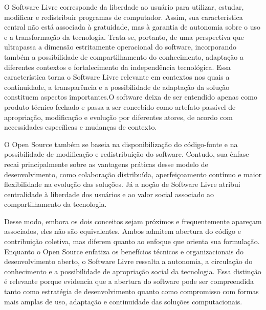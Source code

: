 \documentclass[grad,pdftex]{poli}
\begin{document}
O Software Livre corresponde da liberdade ao usuário para utilizar, estudar, modificar e redistribuir programas de computador. Assim, sua característica central não está associada à gratuidade, mas à garantia de autonomia sobre o uso e a transformação da tecnologia. Trata-se, portanto, de uma perspectiva que ultrapassa a dimensão estritamente operacional do software, incorporando também a possibilidade de compartilhamento do conhecimento, adaptação a diferentes contextos e fortalecimento da independência tecnológica. Essa característica torna o Software Livre  relevante em contextos nos quais a continuidade, a transparência e a possibilidade de adaptação da solução constituem aspectos importantes.O software deixa de ser entendido apenas como produto técnico fechado e passa a ser concebido como artefato passível de apropriação, modificação e evolução por diferentes atores, de acordo com necessidades específicas e mudanças de contexto.

O Open Source também se baseia na disponibilização do código-fonte e na possibilidade de modificação e redistribuição do software. Contudo, sua ênfase recai principalmente sobre as vantagens práticas desse modelo de desenvolvimento, como colaboração distribuída, aperfeiçoamento contínuo e maior flexibilidade na evolução das soluções. Já a noção de Software Livre atribui centralidade à liberdade dos usuários e ao valor social associado ao compartilhamento da tecnologia.

Desse modo, embora os dois conceitos sejam próximos e frequentemente apareçam associados, eles não são equivalentes. Ambos admitem abertura do código e contribuição coletiva, mas diferem quanto ao enfoque que orienta sua formulação. Enquanto o Open Source enfatiza os benefícios técnicos e organizacionais do desenvolvimento aberto, o Software Livre ressalta a autonomia, a circulação do conhecimento e a possibilidade de apropriação social da tecnologia. Essa distinção é relevante porque evidencia que a abertura do software pode ser compreendida tanto como estratégia de desenvolvimento quanto como compromisso com formas mais amplas de uso, adaptação e continuidade das soluções computacionais.
\end{document}

